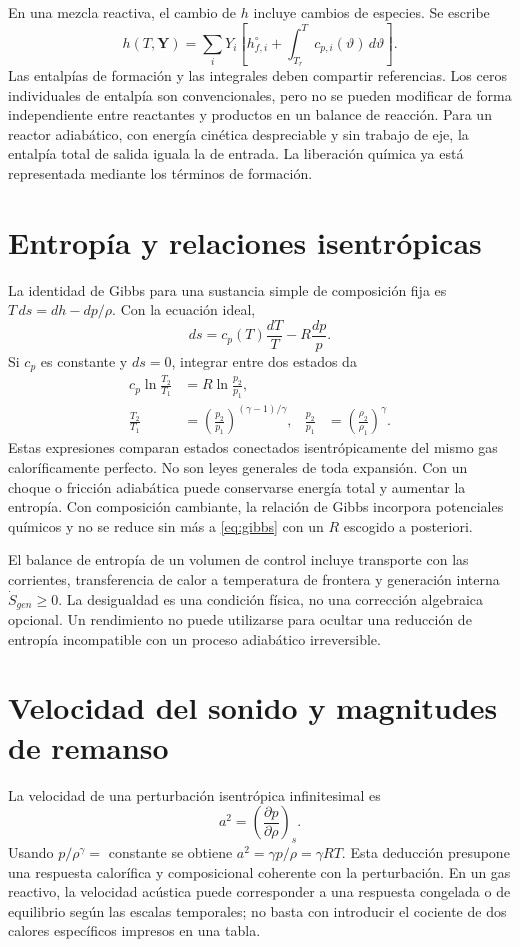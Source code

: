 En una mezcla reactiva, el cambio de $h$ incluye cambios de especies. Se escribe
\begin{equation}
 h(T,\mathbf Y)=\sum_iY_i\left[h_{f,i}^{\circ}+\int_{T_r}^{T}c_{p,i}(\vartheta)\,d\vartheta\right].
\end{equation}
Las entalpías de formación y las integrales deben compartir referencias. Los ceros individuales de entalpía son convencionales, pero no se pueden modificar de forma independiente entre reactantes y productos en un balance de reacción. Para un reactor adiabático, con energía cinética despreciable y sin trabajo de eje, la entalpía total de salida iguala la de entrada. La liberación química ya está representada mediante los términos de formación.
\section{Entropía y relaciones isentrópicas}
La identidad de Gibbs para una sustancia simple de composición fija es $T\,ds=dh-dp/\rho$. Con la ecuación ideal,
\begin{equation}\label{eq:gibbs}
 ds=c_p(T)\frac{dT}{T}-R\frac{dp}{p}.
\end{equation}
Si $c_p$ es constante y $ds=0$, integrar entre dos estados da
\begin{align}
 c_p\ln\frac{T_2}{T_1}&=R\ln\frac{p_2}{p_1},\\
 \frac{T_2}{T_1}&=\left(\frac{p_2}{p_1}\right)^{(\gamma-1)/\gamma}, &
 \frac{p_2}{p_1}&=\left(\frac{\rho_2}{\rho_1}\right)^\gamma.
\end{align}
Estas expresiones comparan estados conectados isentrópicamente del mismo gas caloríficamente perfecto. No son leyes generales de toda expansión. Con un choque o fricción adiabática puede conservarse energía total y aumentar la entropía. Con composición cambiante, la relación de Gibbs incorpora potenciales químicos y no se reduce sin más a \eqref{eq:gibbs} con un $R$ escogido a posteriori.

El balance de entropía de un volumen de control incluye transporte con las corrientes, transferencia de calor a temperatura de frontera y generación interna $\dot S_{gen}\geq0$. La desigualdad es una condición física, no una corrección algebraica opcional. Un rendimiento no puede utilizarse para ocultar una reducción de entropía incompatible con un proceso adiabático irreversible.
\section{Velocidad del sonido y magnitudes de remanso}
La velocidad de una perturbación isentrópica infinitesimal es
\begin{equation}
 a^2=\left(\frac{\partial p}{\partial\rho}\right)_s.
\end{equation}
Usando $p/\rho^\gamma=$ constante se obtiene $a^2=\gamma p/\rho=\gamma RT$. Esta deducción presupone una respuesta calorífica y composicional coherente con la perturbación. En un gas reactivo, la velocidad acústica puede corresponder a una respuesta congelada o de equilibrio según las escalas temporales; no basta con introducir el cociente de dos calores específicos impresos en una tabla.


